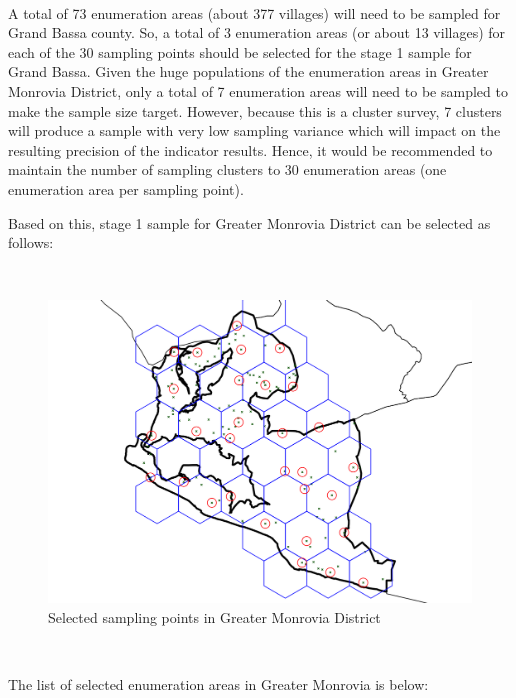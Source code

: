 \documentclass[12pt,a4paper]{book}
\theoremstyle{definition}
\theoremstyle{definition}
\theoremstyle{definition}
\theoremstyle{remark}
\begin{document}
~

A total of 73 enumeration areas (about 377 villages) will need to be
sampled for Grand Bassa county. So, a total of 3 enumeration areas (or
about 13 villages) for each of the 30 sampling points should be selected
for the stage 1 sample for Grand Bassa. Given the huge populations of
the enumeration areas in Greater Monrovia District, only a total of 7
enumeration areas will need to be sampled to make the sample size
target. However, because this is a cluster survey, 7 clusters will
produce a sample with very low sampling variance which will impact on
the resulting precision of the indicator results. Hence, it would be
recommended to maintain the number of sampling clusters to 30
enumeration areas (one enumeration area per sampling point).

Based on this, stage 1 sample for Greater Monrovia District can be
selected as follows:

~

\begin{figure}[H]

\includegraphics{figures/sample24-1} \hfill{}

\caption{Selected sampling points in Greater Monrovia District}\label{fig:sample24}
\end{figure}

~

The list of selected enumeration areas in Greater Monrovia is below:

~
\end{document}
